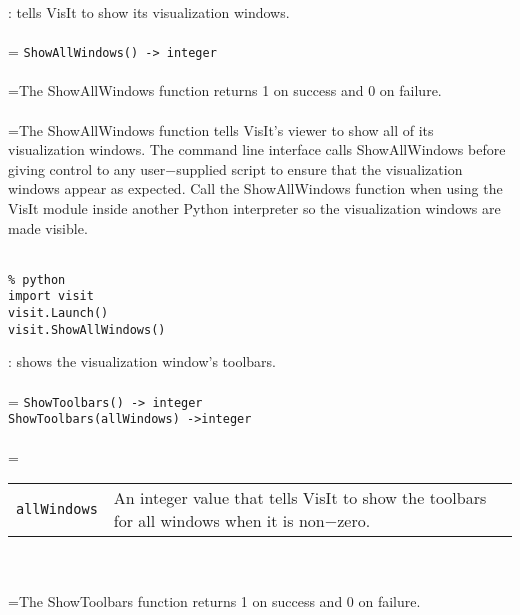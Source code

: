 \documentclass[10pt,a4paper]{report}
\begin{document}
{}
: tells VisIt to show its visualization windows.\\[-3mm]

 \\ 
\hangindent=\parindent 
\verb!ShowAllWindows() -> integer!\\ [-3mm]

 \\ 
\hangindent=\parindent The ShowAllWindows function returns 1 on success and 0 on failure. \\[-3mm] 

 \\ 
\hangindent=\parindent The ShowAllWindows function tells VisIt's viewer to show all of its visualization windows. The command line interface calls ShowAllWindows before giving control to any user$-$supplied script to ensure that the visualization windows appear as expected. Call the ShowAllWindows function when using the VisIt module inside another Python interpreter so the visualization windows are made visible. \\[-3mm] 

\\[-6mm]
\begin{verbatim}% python
import visit
visit.Launch()
visit.ShowAllWindows()
\end{verbatim}
\newpage


{}
: shows the visualization window's toolbars.\\[-3mm]

 \\ 
\hangindent=\parindent 
\verb!ShowToolbars() -> integer!\\ 
\verb!ShowToolbars(allWindows) ->integer!\\ [-3mm]

 \\ 
\hangindent=\parindent 
\begin{tabular}{lp{9cm}}
\verb!allWindows! & An integer value that tells VisIt to show the toolbars for all windows when it is non$-$zero. \\
\end{tabular} \\[-2mm]


 \\ 
\hangindent=\parindent The ShowToolbars function returns 1 on success and 0 on failure. \\[-3mm] 
\end{document}
